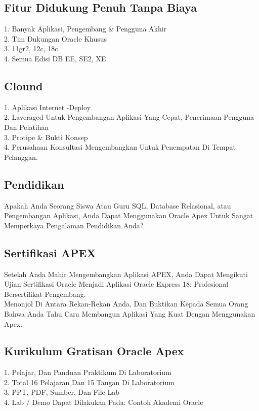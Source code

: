 \documentclass{article}
\begin{document}
\subsection{Fitur Didukung Penuh Tanpa Biaya}
1.	Banyak Aplikasi, Pengembang & Pengguna Akhir\\
2.	Tim Dukungan Oracle Khusus\\
3.	11gr2, 12c, 18c\\
4.	Semua Edisi DB EE, SE2, XE\\

\subsection{Clound}
1.	Aplikasi Internet -Deploy\\
2.	Laveraged Untuk Pengembangan Aplikasi Yang Cepat, Penerimaan Pengguna Dan Pelatihan\\
3.	Protipe & Bukti Konsep\\
4.	Perusahaan Konsultasi Mengembangkan Untuk Penempatan Di Tempat Pelanggan.\\

\subsection{Pendidikan}
Apakah Anda Seorang Siswa Atau Guru SQL, Database Relasional, atau Pengembangan Aplikasi, Anda Dapat Menggunakan Oracle Apex Untuk Sangat Memperkaya Pengalaman Pendidikan Anda?\\

\subsection{Sertifikasi APEX}
Setelah Anda Mahir Mengembangkan Aplikasi APEX, Anda Dapat Mengikuti Ujian Sertifikasi Oracle Menjadi Aplikasi Oracle Express 18: Profesional Bersertifikat Pengembang.\\

Menonjol Di Antara Rekan-Rekan Anda, Dan Buktikan Kepada Semua Orang Bahwa Anda Tahu Cara Membangun Aplikasi Yang Kuat Dengan Menggunakan Apex.\\

\subsection{Kurikulum Gratisan Oracle Apex}
1.	Pelajar, Dan Panduan Praktikum Di Laboratorium\\
2.	Total 16 Pelajaran Dan 15 Tangan Di Laboratorium\\
3.	PPT, PDF, Sumber, Dan File Lab\\
4.	Lab / Demo Dapat Dilakukan Pada: Contoh Akademi Oracle\\
\end{document}

